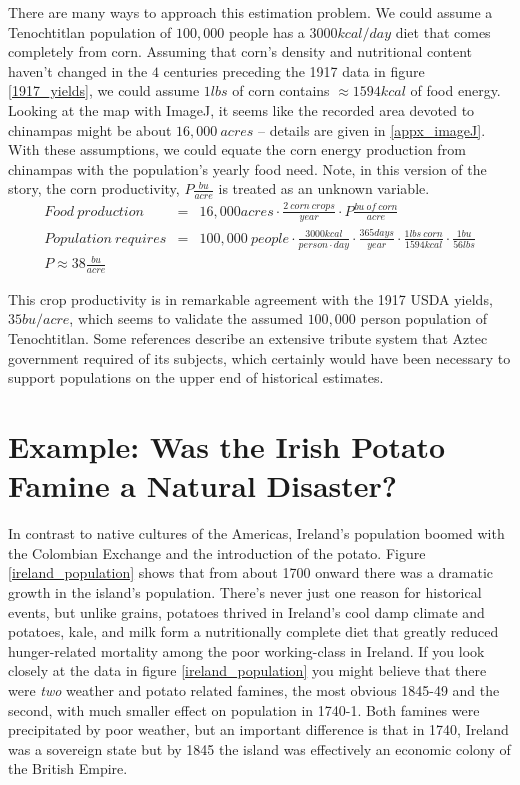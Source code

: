 \documentclass[prb,preprint]{revtex4-2}
\newcommand{\bea}{\begin{eqnarray}}
\newcommand{\eea}{\end{eqnarray}}
\begin{document}
There are many ways to approach this estimation problem.  We could assume a Tenochtitlan population of $100,000$ people has a $3000kcal/day$ diet that comes completely from corn.  Assuming that corn's density and nutritional content haven't changed in the $4$ centuries preceding the 1917 data in figure \ref{1917_yields}, we could assume $1lbs$ of corn contains $\approx1594kcal$ of food energy.  
Looking at the map with ImageJ,\cite{imageJ} it seems like the recorded area devoted to chinampas might be about
$16,000~acres$ -- details are given in \ref{appx_imageJ}.
With these assumptions, we could equate the corn energy production from chinampas with the population's yearly food need. Note, in this version of the story, the corn productivity, $P\frac{bu}{acre}$ is treated as an unknown variable.  
\bea
Food~production &=& 16,000acres\cdot \frac{2~corn~crops}{year}\cdot P \frac{bu~of~corn}{acre} \nonumber \\
Population~requires &=& 100,000~people\cdot \frac{3000kcal}{person\cdot day}\cdot\frac{365days}{year}\cdot\frac{1lbs~corn}{1594kcal}\cdot\frac{1bu}{56lbs} \nonumber \\
P \approx 38\frac{bu}{acre} && 
\eea

This crop productivity is in remarkable agreement with the 1917 USDA yields, $35bu/acre$, which seems to validate the assumed $100,000$ person population of Tenochtitlan.  Some references\cite{Chinampas_1964} describe an extensive tribute system that Aztec government required of its subjects, which certainly would have been necessary to support populations on the upper end of historical estimates.\cite{400k}




\clearpage


\section{Example: Was the Irish Potato Famine a Natural Disaster?}
In contrast to native cultures of the Americas, Ireland's population boomed with the Colombian Exchange and the introduction of the potato.\cite{potato,little_ice_age}  Figure \ref{ireland_population} shows that from about 1700 onward there was a dramatic growth in the island's population.  There's never just one reason for historical events, but unlike grains, potatoes thrived in Ireland's cool damp climate and potatoes, kale, and milk form a nutritionally complete diet that greatly reduced hunger-related mortality among the poor working-class in Ireland.  If you look closely at the data in figure \ref{ireland_population} you might believe that there were \textit{two} weather and potato related famines, the most obvious 1845-49 and the second, with much smaller effect on population in 1740-1.  Both famines were precipitated by poor weather, but an important difference is that in 1740, Ireland was a sovereign state but by 1845 the island was effectively an economic colony of the British Empire.\cite{little_ice_age}  
\end{document}
